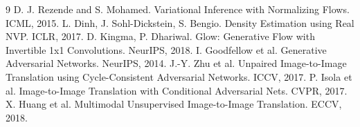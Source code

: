 \documentclass[11pt]{article}
\begin{document}

\begin{thebibliography}{9}
 D. J. Rezende and S. Mohamed. Variational Inference with Normalizing Flows. ICML, 2015.
 L. Dinh, J. Sohl-Dickstein, S. Bengio. Density Estimation using Real NVP. ICLR, 2017.
 D. Kingma, P. Dhariwal. Glow: Generative Flow with Invertible 1x1 Convolutions. NeurIPS, 2018.
 I. Goodfellow et al. Generative Adversarial Networks. NeurIPS, 2014.
 J.-Y. Zhu et al. Unpaired Image-to-Image Translation using Cycle-Consistent Adversarial Networks. ICCV, 2017.
 P. Isola et al. Image-to-Image Translation with Conditional Adversarial Nets. CVPR, 2017.
 X. Huang et al. Multimodal Unsupervised Image-to-Image Translation. ECCV, 2018.
\end{thebibliography}
\end{document}
